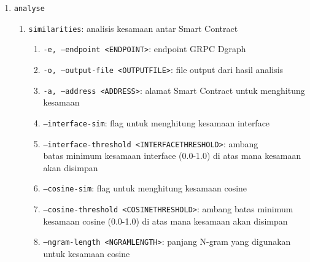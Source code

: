 \begin{enumerate}
\begin{enumerate}
        \item \texttt{-d, --dgraph <DGRAPH>}: endpoint GRPC Dgraph
        \item \texttt{--include-tx}: flag untuk menyertakan transaksi dalam \textit{streaming}
        \item \texttt{--include-tokens}: flag untuk menyertakan transfer token dalam \textit{streaming}
        \item \texttt{--include-logs}: flag untuk menyertakan log dalam \textit{streaming}
        \item \texttt{--decompiler-timeout <DECOMPILER\textunderscore TIMEOUT>}: waktu maksimal untuk dekompilasi Smart Contract, dalam milliseconds
        \item \texttt{--no-sync}: flag untuk melewati sinkronisasi dari blok terakhir yang diindeks di Dgraph, hanya mengambil blok live
        \item \texttt{-n, --num-jobs <NUM\textunderscore JOBS>}: jumlah Tokio \textit{tasks} yang akan dijalankan secara paralel 
    \end{enumerate}
    \item \texttt{analyse}
    \begin{enumerate}
        \item \texttt{similarities}: analisis kesamaan antar Smart Contract
        \begin{enumerate}
            \item \texttt{-e, --endpoint <ENDPOINT>}: endpoint GRPC Dgraph 
            \item \texttt{-o, --output-file <OUTPUT\textunderscore FILE>}: file output dari hasil analisis
            \item \texttt{-a, --address <ADDRESS>}: alamat Smart Contract untuk menghitung kesamaan
            \item \texttt{--interface-sim}: flag untuk menghitung kesamaan interface
            \item \texttt{--interface-threshold <INTERFACE\textunderscore THRESHOLD>}: ambang \\batas minimum kesamaan interface (0.0-1.0) di atas mana kesamaan akan disimpan
            \item \texttt{--cosine-sim}: flag untuk menghitung kesamaan cosine
            \item \texttt{--cosine-threshold <COSINE\textunderscore THRESHOLD>}: ambang batas minimum kesamaan cosine (0.0-1.0) di atas mana kesamaan akan disimpan
            \item \texttt{--ngram-length <NGRAM\textunderscore LENGTH>}: panjang N-gram yang digunakan untuk kesamaan cosine

\end{enumerate}
\end{enumerate}
\end{enumerate}
